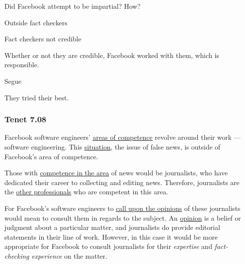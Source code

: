 \par Did Facebook attempt to be impartial? How?

\par Outside fact checkers \cite{tc_downranks}

\par Fact checkers not credible \cite{vox_sentences}

\par Whether or not they are credible, Facebook worked with them, which is responsible.

\par Segue


\par They tried their best.

\subsubsection{Tenet 7.08}


\par Facebook software engineers' \ul{areas of competence} revolve around their work --- software engineering. This \ul{situation}, the issue of false news, is outside of Facebook's area of competence.

\par Those with \ul{competence in the area} of news would be journalists, who have dedicated their career to collecting and editing news. \cite{merriam_webster} Therefore, journalists are the \ul{other professionals} who are competent in this area.

\par For Facebook's software engineers to \ul{call upon the opinions} of these journalists would mean to consult them in regards to the subject. An \ul{opinion} is a belief or judgment about a particular matter, \cite{merriam_webster} and journalists do provide editorial statements in their line of work. However, in this case it would be more appropriate for Facebook to consult journalists for their \emph{expertise} and \emph{fact-checking experience} on the matter.


